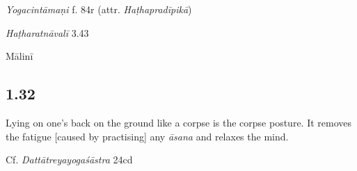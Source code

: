 \begin{ekdosis}
\begin{testimonia}[hp01_031]
\emph{Yogacintāmaṇi} f. 84r (attr. \emph{Haṭhapradīpikā})

\begin{versinnote}
\end{versinnote}

\emph{Haṭharatnāvalī} 3.43

\begin{versinnote}
\end{versinnote}

\end{testimonia}


\begin{metre}[hp01_031]
Mālinī 
\end{metre}

\subsection*{1.32}
\begin{translation}[hp01_032]
Lying on one's back on the ground like a corpse is the corpse posture. It removes the fatigue [caused by practising] any \emph{āsana} and relaxes the mind.
\end{translation}

\begin{sources}[hp01_032]
Cf. \emph{Dattātreyayogaśāstra} 24cd

\begin{versinnote}
\end{versinnote}

\end{sources}


\end{ekdosis}
